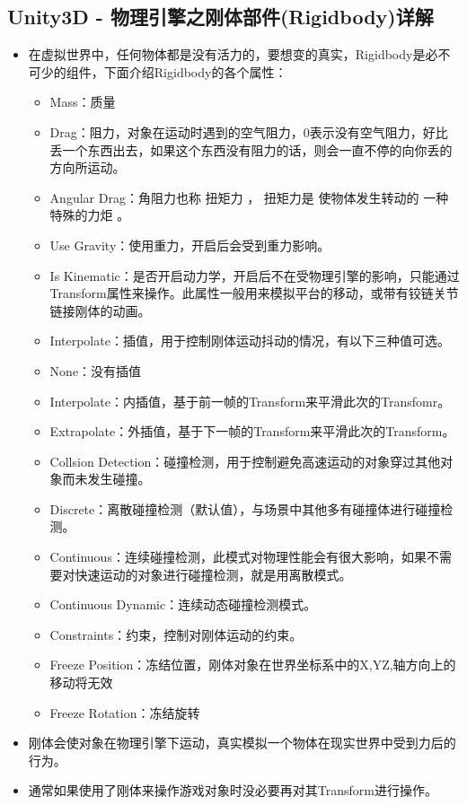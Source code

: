 \documentclass[9pt, b5paper]{article}
\begin{document}
\subsection{Unity3D - 物理引擎之刚体部件(Rigidbody)详解}
\label{sec:org3ae0088}
\begin{itemize}
\item 在虚拟世界中，任何物体都是没有活力的，要想变的真实，Rigidbody是必不可少的组件，下面介绍Rigidbody的各个属性：
\begin{itemize}
\item Mass：质量
\item Drag：阻力，对象在运动时遇到的空气阻力，0表示没有空气阻力，好比丢一个东西出去，如果这个东西没有阻力的话，则会一直不停的向你丢的方向所运动。
\item Angular Drag：角阻力也称 扭矩力 ， 扭矩力是 使物体发生转动的 一种特殊的力炬 。
\item Use Gravity：使用重力，开启后会受到重力影响。
\item Is Kinematic：是否开启动力学，开启后不在受物理引擎的影响，只能通过Transform属性来操作。此属性一般用来模拟平台的移动，或带有铰链关节链接刚体的动画。
\item Interpolate：插值，用于控制刚体运动抖动的情况，有以下三种值可选。
\item None：没有插值
\item Interpolate：内插值，基于前一帧的Transform来平滑此次的Transfomr。
\item Extrapolate：外插值，基于下一帧的Transform来平滑此次的Transform。
\item Collsion Detection：碰撞检测，用于控制避免高速运动的对象穿过其他对象而未发生碰撞。
\item Discrete：离散碰撞检测（默认值），与场景中其他多有碰撞体进行碰撞检测。
\item Continuous：连续碰撞检测，此模式对物理性能会有很大影响，如果不需要对快速运动的对象进行碰撞检测，就是用离散模式。
\item Continuous Dynamic：连续动态碰撞检测模式。
\item Constraints：约束，控制对刚体运动的约束。
\item Freeze Position：冻结位置，刚体对象在世界坐标系中的X,YZ,轴方向上的移动将无效
\item Freeze Rotation：冻结旋转
\end{itemize}
\item 刚体会使对象在物理引擎下运动，真实模拟一个物体在现实世界中受到力后的行为。
\item 通常如果使用了刚体来操作游戏对象时没必要再对其Transform进行操作。
\end{itemize}
\end{document}
